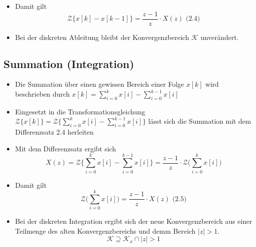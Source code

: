 \documentclass[11pt]{article}
\providecommand{\tightlist}{%
      \setlength{\itemsep}{0pt}\setlength{\parskip}{0pt}}
\def\gt{>}
\begin{document}
    \begin{itemize}
\tightlist
\item
  Damit gilt
  \[\mathcal{Z}\{x[k] - x[k-1]\} = \frac{z-1}{z} \cdot X(z)\textrm{  (2.4)}\]
\end{itemize}

    \begin{itemize}
\tightlist
\item
  Bei der diskreten Ableitung bleibt der Konvergenzbereich
  \(\mathcal{K}\) unverändert.
\end{itemize}

    \subsection{Summation (Integration)}\label{summation-integration}

\begin{itemize}
\tightlist
\item
  Die Summation über einen gewissen Bereich einer Folge \(x[k]\) wird
  beschrieben durch \(x[k] = \sum_{i=0}^k x[i] - \sum_{i=0}^{k-1} x[i]\)
\end{itemize}

    \begin{itemize}
\tightlist
\item
  Eingesetzt in die Transformationsgleichung
  \(\mathcal{Z}\{x[k]\} = \mathcal{Z} \{\sum_{i=0}^k x[i] - \sum_{i=0}^{k-1} x[i]\}\)
  lässt sich die Summation mit dem Differenzsatz 2.4 herleiten
\end{itemize}

    \begin{itemize}
\tightlist
\item
  Mit dem Differenzsatz ergibt sich
  \[X(z) = \mathcal{Z} \{\sum_{i=0}^k x[i] - \sum_{i=0}^{k-1} x[i]\} = \frac{z-1}{z} \cdot \mathcal{Z}\big( \sum_{i=0}^k x[i] \big)\]
\end{itemize}

    \begin{itemize}
\tightlist
\item
  Damit gilt
  \[\mathcal{Z}\big( \sum_{i=0}^k x[i] \big) = \frac{z-1}{z} \cdot X(z)\textrm{  (2.5)}\]
\end{itemize}

    \begin{itemize}
\tightlist
\item
  Bei der diskreten Integration ergibt sich der neue Konvergenzbereich
  aus einer Teilmenge des alten Konvergenzbereichs und demm Bereich
  \({|z| \gt 1}\).
  \[\mathcal{K} \supseteq \mathcal{K}_x \cap {|z| \gt 1}\]
\end{itemize}
\end{document}
